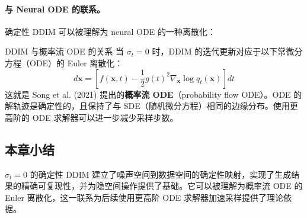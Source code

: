 \paragraph{与 Neural ODE 的联系。} 确定性 DDIM 可以被理解为 neural ODE 的一种离散化：

\begin{knowledgebox}{DDIM 与概率流 ODE 的关系}
当 $\sigma_t = 0$ 时，DDIM 的迭代更新对应于以下常微分方程（ODE）的 Euler 离散化：
$$
d\mathbf{x} = \left[f(\mathbf{x}, t) - \frac{1}{2}g(t)^2 \nabla_\mathbf{x} \log q_t(\mathbf{x})\right] dt
$$
这就是 Song et al. (2021) 提出的\textbf{概率流 ODE}（probability flow ODE）。ODE 的解轨迹是确定性的，且保持了与 SDE（随机微分方程）相同的边缘分布。使用更高阶的 ODE 求解器可以进一步减少采样步数。
\end{knowledgebox}

\subsection{本章小结}

$\sigma_t=0$ 的确定性 DDIM 建立了噪声空间到数据空间的确定性映射，实现了生成结果的精确可复现性，并为隐空间操作提供了基础。它可以被理解为概率流 ODE 的 Euler 离散化，这一联系为后续使用更高阶 ODE 求解器加速采样提供了理论依据。


